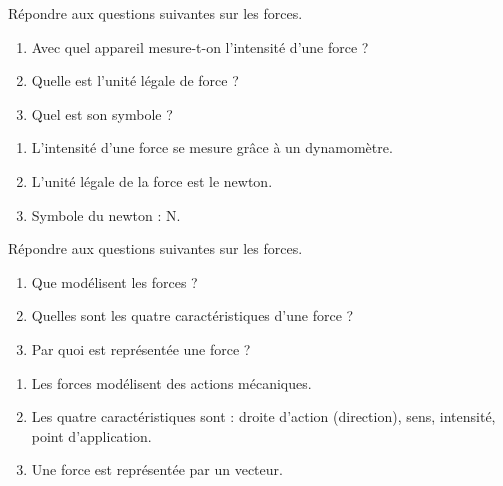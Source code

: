 


















\begin{exercice}
Répondre aux questions suivantes sur les forces.
\begin{enumerate}
\item Avec quel appareil mesure-t-on l'intensité d'une force ?
\item Quelle est l'unité légale de force ?
\item Quel est son symbole ?
\end{enumerate}
\end{exercice}


\begin{corrige}
\begin{enumerate}
\item L'intensité d'une force se mesure grâce à un dynamomètre.
\item L'unité légale de la force est le newton.
\item Symbole du newton : N.
\end{enumerate}
\end{corrige}






\begin{exercice}
Répondre aux questions suivantes sur les forces.
\begin{enumerate}
\item Que modélisent les forces ? 
\item Quelles sont les quatre caractéristiques d'une force ?
\item Par quoi est représentée une force ?
\end{enumerate}
\end{exercice}


\begin{corrige}
\begin{enumerate}
\item Les forces modélisent des actions mécaniques.
\item Les quatre caractéristiques sont : droite d'action (direction), sens, intensité, point d'application.
\item Une force est représentée par un vecteur.
\end{enumerate}
\end{corrige}






